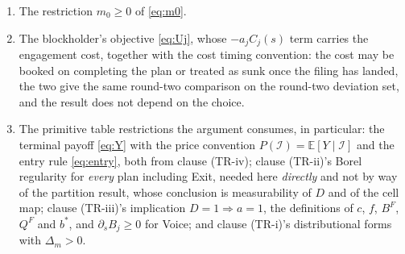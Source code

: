 \documentclass[11pt]{article}
\newcommand{\Eop}{\mathbb{E}}
\begin{document}
\begin{enumerate}[label=(P-\arabic*),leftmargin=3.2em,itemsep=2pt]
  reading of the cost timing, is this: on that set the flagged price does not move and the flagged
  order cancels, so the engagement cost is the only thing that can differ between staying and
  deviating, and at a flagged pair the cutoff vector does not select there is no date-$0$ optimality
  to fall back on, so without the clause the deviator takes the class member with the smallest
  cost and clause (ii) of the equilibrium definition fails at that node. Under the sunk reading the
  continuation is constant on the deviation set with no clause at all and the hypothesis is not
  consumed; it is listed because the statement does not commit to a reading, and it is what makes
  the conclusion hold under both.
\item The restriction $m_0\geq0$ of \eqref{eq:m0}.
\item The blockholder's objective \eqref{eq:Uj}, whose $-a_jC_j(s)$ term carries the engagement cost,
  together with the cost timing convention: the cost may be booked on completing the plan or treated
  as sunk once the filing has landed, the two give the same round-two comparison on the round-two
  deviation set, and the result does not depend on the choice.
\item The primitive table restrictions the argument consumes, in particular: the terminal payoff
  \eqref{eq:Y} with the price convention $P(\mathcal I)=\Eop[Y\mid\mathcal I]$ and the entry rule
  \eqref{eq:entry}, both from clause (TR-iv); clause (TR-ii)'s Borel regularity for \emph{every}
  plan including Exit, needed here \emph{directly} and not by way of the partition result, whose
  conclusion is measurability of $D$ and of the cell map; clause (TR-iii)'s implication
  $D=1\Rightarrow a=1$, the definitions of $c$, $f$, $B^F$, $Q^F$ and $b^*$, and
  $\partial_sB_j\geq0$ for Voice; and clause (TR-i)'s distributional forms with $\Delta_m>0$.
\end{enumerate}
\end{document}

